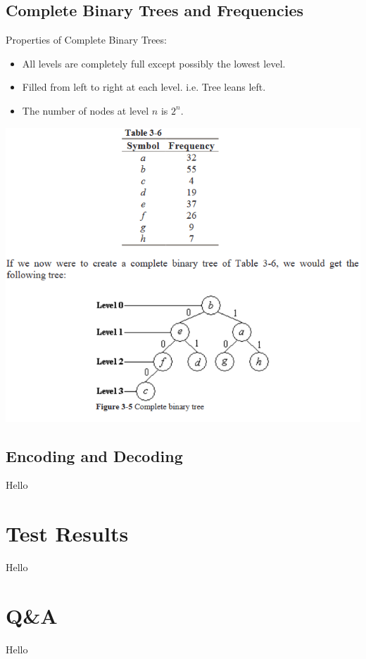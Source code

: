 \documentclass{beamer}
\begin{document}
\subsection{Complete Binary Trees and Frequencies}
\begin{frame}
Properties of Complete Binary Trees:
\begin{itemize}
\item All levels are completely full except possibly the lowest level.
\item Filled from left to right at each level. i.e. Tree leans left.
\item The number of nodes at level $n$ is $2^n$.
\end{itemize}
\end{frame}

\begin{frame}
\begin{center}
\includegraphics[scale=0.55]{example}
\end{center}
\end{frame}

\subsection{Encoding and Decoding}
\begin{frame}
Hello
\end{frame}

\section{Test Results}
\begin{frame}
Hello
\end{frame}

\section{Q\&A}
\begin{frame}
Hello
\end{frame}
\end{document}

